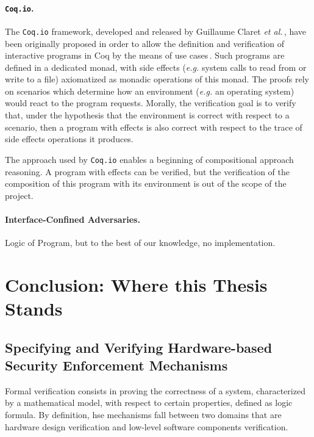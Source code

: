 \paragraph{\texttt{Coq.io}.}
%
The \texttt{Coq.io} framework, developed and released by Guillaume Claret
\emph{et al.}\,\cite{claret2015coqiowww}, have been originally proposed in order
to allow the definition and verification of interactive programs in Coq by the
means of use cases\,\cite{claret2015coqio}.
%
Such programs are defined in a dedicated monad, with side effects (\emph{e.g.}
system calls to read from or write to a file) axiomatized as monadic operations
of this monad.
%
The proofs rely on scenarios which determine how an environment (\emph{e.g.} an
operating system) would react to the program requests.
%
Morally, the verification goal is to verify that, under the hypothesis that the
environment is correct with respect to a scenario, then a program with effects
is also correct with respect to the trace of side effects operations it
produces.

The approach used by \texttt{Coq.io} enables a beginning of compositional
approach reasoning.
%
A program with effects can be verified, but the verification of the composition
of this program with its environment is out of the scope of the project.


\paragraph{Interface-Confined Adversaries.}
%
Logic of Program, but to the best of our knowledge, no implementation.

\section{Conclusion: Where this Thesis Stands}
\label{sec:sota:conclusion}

\subsection{Specifying and Verifying Hardware-based Security Enforcement
  Mechanisms}

Formal verification consists in proving the correctness of a system,
characterized by a mathematical model, with respect to certain properties,
defined as logic formula.
%
By definition, \ac{hse} mechanisms fall between two domains that are hardware
design verification and low-level software components verification.

